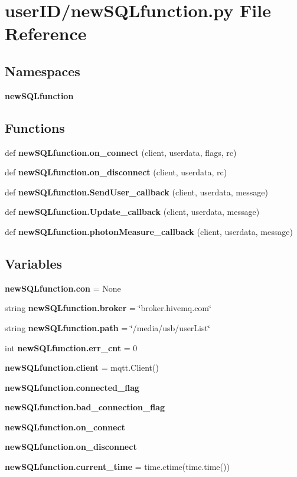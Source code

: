 \section{user\+I\+D/new\+S\+Q\+Lfunction.py File Reference}
\label{new_s_q_lfunction_8py}
\subsection*{Namespaces}
\begin{DoxyCompactItemize}
\item 
 \textbf{ new\+S\+Q\+Lfunction}
\end{DoxyCompactItemize}
\subsection*{Functions}
\begin{DoxyCompactItemize}
\item 
def \textbf{ new\+S\+Q\+Lfunction.\+on\+\_\+connect} (client, userdata, flags, rc)
\item 
def \textbf{ new\+S\+Q\+Lfunction.\+on\+\_\+disconnect} (client, userdata, rc)
\item 
def \textbf{ new\+S\+Q\+Lfunction.\+Send\+User\+\_\+callback} (client, userdata, message)
\item 
def \textbf{ new\+S\+Q\+Lfunction.\+Update\+\_\+callback} (client, userdata, message)
\item 
def \textbf{ new\+S\+Q\+Lfunction.\+photon\+Measure\+\_\+callback} (client, userdata, message)
\end{DoxyCompactItemize}
\subsection*{Variables}
\begin{DoxyCompactItemize}
\item 
\textbf{ new\+S\+Q\+Lfunction.\+con} = None
\item 
string \textbf{ new\+S\+Q\+Lfunction.\+broker} = \char`\"{}broker.\+hivemq.\+com\char`\"{}
\item 
string \textbf{ new\+S\+Q\+Lfunction.\+path} = \char`\"{}/media/usb/user\+List\char`\"{}
\item 
int \textbf{ new\+S\+Q\+Lfunction.\+err\+\_\+cnt} = 0
\item 
\textbf{ new\+S\+Q\+Lfunction.\+client} = mqtt.\+Client()
\item 
\textbf{ new\+S\+Q\+Lfunction.\+connected\+\_\+flag}
\item 
\textbf{ new\+S\+Q\+Lfunction.\+bad\+\_\+connection\+\_\+flag}
\item 
\textbf{ new\+S\+Q\+Lfunction.\+on\+\_\+connect}
\item 
\textbf{ new\+S\+Q\+Lfunction.\+on\+\_\+disconnect}
\item 
\textbf{ new\+S\+Q\+Lfunction.\+current\+\_\+time} = time.\+ctime(time.\+time())
\end{DoxyCompactItemize}
